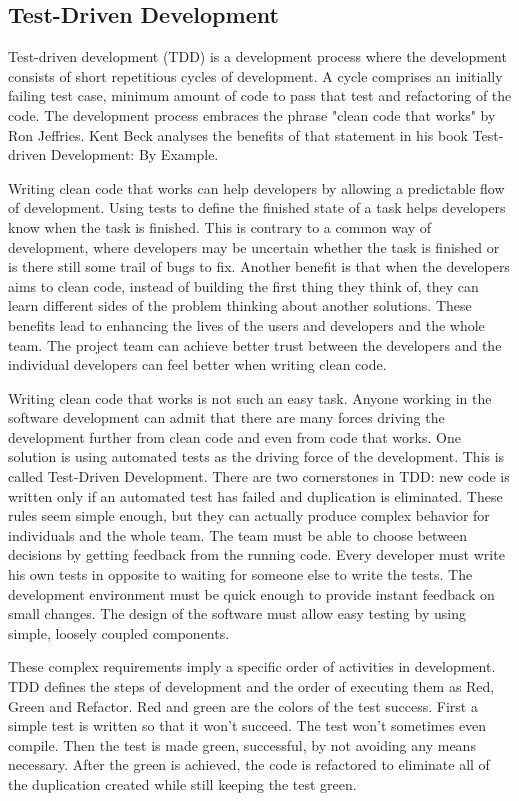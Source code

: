 \subsection{Test-Driven Development} 
Test-driven development (TDD) is a development process where the development consists of short repetitious cycles of development. A cycle comprises an initially failing test case, minimum amount of code to pass that test and refactoring of the code. The development process embraces the phrase "clean code that works" by Ron Jeffries. Kent Beck analyses the benefits of that statement in his book Test-driven Development: By Example.~\cite{beck2003test}

Writing clean code that works can help developers by allowing a predictable flow of development. Using tests to define the finished state of a task helps developers know when the task is finished. This is contrary to a common way of development, where developers may be uncertain whether the task is finished or is there still some trail of bugs to fix. Another benefit is that when the developers aims to clean code, instead of building the first thing they think of, they can learn different sides of the problem thinking about another solutions. These benefits lead to enhancing the lives of the users and developers and the whole team. The project team can achieve better trust between the developers and the individual developers can feel better when writing clean code.~\cite{beck2003test}

Writing clean code that works is not such an easy task. Anyone working in the software development can admit that there are many forces driving the development further from clean code and even from code that works. One solution is using automated tests as the driving force of the development. This is called Test-Driven Development. There are two cornerstones in TDD: new code is written only if an automated test has failed and duplication is eliminated. These rules seem simple enough, but they can actually produce complex behavior for individuals and the whole team. The team must be able to choose between decisions by getting feedback from the running code. Every developer must write his own tests in opposite to waiting for someone else to write the tests. The development environment must be quick enough to provide instant feedback on small changes. The design of the software must allow easy testing by using simple, loosely coupled components.~\cite{beck2003test}

These complex requirements imply a specific order of activities in development. TDD defines the steps of development and the order of executing them as Red, Green and Refactor. Red and green are the colors of the test success. First a simple test is written so that it won't succeed. The test won't sometimes even compile. Then the test is made green, successful, by not avoiding any means necessary. After the green is achieved, the code is refactored to eliminate all of the duplication created while still keeping the test green.~\cite{beck2003test}


